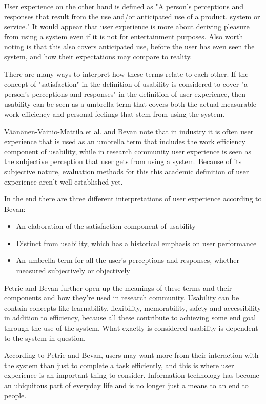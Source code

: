 User experience on the other hand is defined as "A person's perceptions and responses that result from the use and/or anticipated use of a product, system or service." It would appear that user experience is more about deriving pleasure from using a system even if it is not for entertainment purposes. Also worth noting is that this also covers anticipated use, before the user has even seen the system, and how their expectations may compare to reality.

There are many ways to interpret how these terms relate to each other. If the concept of "satisfaction" in the definition of usability is considered to cover "a person's perceptions and responses" in the definition of user experience, then usability can be seen as a umbrella term that covers both the actual measurable work efficiency and personal feelings that stem from using the system.

Väänänen-Vainio-Mattila et al. and Bevan note that in industry it is often user experience that is used as an umbrella term that includes the work efficiency component of usability, while in research community user experience is seen as the subjective perception that user gets from using a system. Because of its subjective nature, evaluation methods for this this academic definition of user experience aren't well-established yet. \cite{bevan2009difference, vaananen2008towards}

In the end there are three different interpretations of user experience according to Bevan: \begin{itemize}
\item An  elaboration  of  the  satisfaction  component  of usability
\item Distinct  from  usability,  which  has  a  historical emphasis on user performance
\item An  umbrella  term  for  all  the  user’s  perceptions  and responses,  whether  measured  subjectively  or objectively
\end{itemize}
\cite{bevan2009difference}

Petrie and Bevan further open up the meanings of these terms and their components and how they're used in research community. Usability can be contain concepts like learnability, flexibility, memorability, safety and accessibility in addition to efficiency, because all these contribute to achieving some end goal through the use of the system. What exactly is considered usability is dependent to the system in question. 

According to Petrie and Bevan, users may want more from their interaction with the system than just to complete a task efficiently, and this is where user experience is an important thing to consider. Information technology has become an ubiquitous part of everyday life and is no longer just a means to an end to people.
\cite{bevanevaluation}

